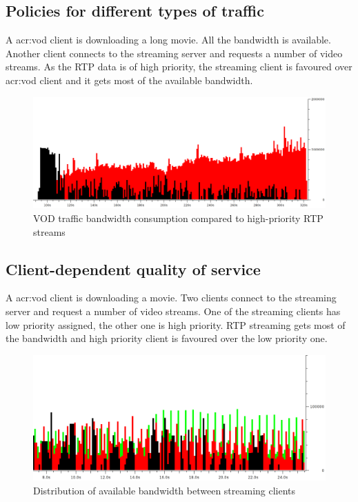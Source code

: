 \documentclass[11pt]{book}
\begin{document}
      \subsection{Policies for different types of traffic}
      \label{sub:uc:traffic}

        A \gls{acr:vod} client is downloading a long movie. All the bandwidth is available. Another client connects to the
        streaming server and requests a number of video streams. As the RTP data is of high priority, the streaming
        client is favoured over \gls{acr:vod} client and it gets most of the available bandwidth.

        \begin{figure}[H]
          \begin{center}
            \includegraphics[width=.7\textwidth]{img/test-case/vod-rtp.png}
          \end{center}

          \caption{VOD traffic bandwidth consumption compared to high-priority RTP streams}
        \end{figure}


      \subsection{Client-dependent quality of service}
      \label{sub:uc:client}

        A \gls{acr:vod} client is downloading a movie. Two clients connect to the streaming server and request a number of video
        streams. One of the streaming clients has low priority assigned, the other one is high priority. RTP streaming
        gets most of the bandwidth and high priority client is favoured over the low priority one.

        \begin{figure}[H]
          \begin{center}
            \includegraphics[width=.7\textwidth]{img/test-case/exp-all.png}
          \end{center}

          \caption{Distribution of available bandwidth between streaming clients}
        \end{figure}
\end{document}
